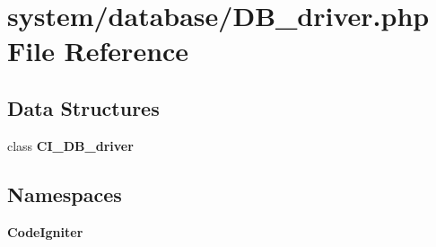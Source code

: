 \section{system/database/\-D\-B\-\_\-driver.php File Reference}
\label{_d_b__driver_8php}
\subsection*{Data Structures}
\begin{DoxyCompactItemize}
\item 
class {\bf C\-I\-\_\-\-D\-B\-\_\-driver}
\end{DoxyCompactItemize}
\subsection*{Namespaces}
\begin{DoxyCompactItemize}
\item 
{\bf Code\-Igniter}
\end{DoxyCompactItemize}

